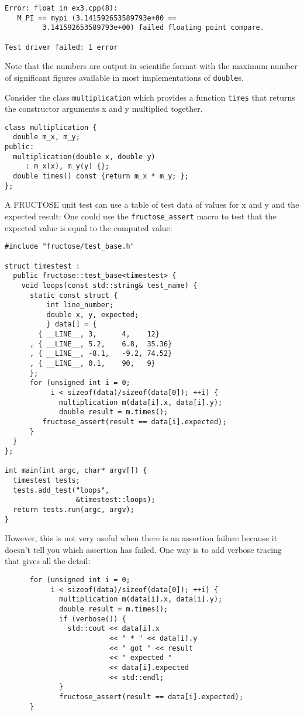 \documentclass{book}
\begin{document}
\begin{verbatim}
Error: float in ex3.cpp(8): 
   M_PI == mypi (3.141592653589793e+00 == 
         3.141592653589793e+00) failed floating point compare.

Test driver failed: 1 error
\end{verbatim}
Note that the numbers are output in scientific format with the maximum
number of significant figures available in most implementations
of {\tt double}s.

\label{loops}

Consider the class {\tt multiplication}
which provides a function {\tt times} that returns the constructor arguments
x and y multiplied together.
\begin{verbatim}
class multiplication {
  double m_x, m_y;
public:
  multiplication(double x, double y) 
     : m_x(x), m_y(y) {};
  double times() const {return m_x * m_y; };
};
\end{verbatim}
A FRUCTOSE unit test can use a table of test data of
values for x and y and the expected result:
One could use the {\tt fructose\_assert} macro to test
that the expected value is equal to the computed value:
\begin{verbatim}
#include "fructose/test_base.h"

struct timestest : 
  public fructose::test_base<timestest> {
    void loops(const std::string& test_name) {
      static const struct {
          int line_number;
          double x, y, expected;
          } data[] = {
        { __LINE__, 3,      4,    12}
      , { __LINE__, 5.2,    6.8,  35.36}
      , { __LINE__, -8.1,   -9.2, 74.52}
      , { __LINE__, 0.1,    90,   9}
      };
      for (unsigned int i = 0; 
           i < sizeof(data)/sizeof(data[0]); ++i) {
             multiplication m(data[i].x, data[i].y);
             double result = m.times();
         fructose_assert(result == data[i].expected);
      }
  }
};

int main(int argc, char* argv[]) {
  timestest tests;
  tests.add_test("loops", 
                 &timestest::loops);
  return tests.run(argc, argv);
}
\end{verbatim}
However, this is not very useful when there is an assertion failure
because it doesn't tell you which assertion has failed.
One way is to add verbose tracing that gives all the detail:
\begin{verbatim}
      for (unsigned int i = 0; 
           i < sizeof(data)/sizeof(data[0]); ++i) {
             multiplication m(data[i].x, data[i].y);
             double result = m.times();
             if (verbose()) {
               std::cout << data[i].x 
                         << " * " << data[i].y
                         << " got " << result 
                         << " expected " 
                         << data[i].expected 
                         << std::endl;
             }
             fructose_assert(result == data[i].expected);
      }
\end{verbatim}
\end{document}
